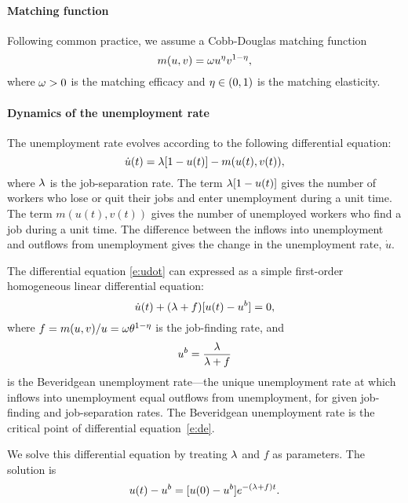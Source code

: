 \documentclass[letterpaper,12pt,leqno]{article}
\begin{document}
\paragraph{Matching function} Following common practice, we assume a Cobb-Douglas matching function
\begin{equation}
m(u,v)=\omega u^{\eta}v^{1-\eta},
\label{e:cobbdouglas}\end{equation}
where $\omega>0$ is the matching efficacy and $\eta\in(0,1)$ is the matching elasticity.

\paragraph{Dynamics of the unemployment rate} The unemployment rate evolves according to the following differential equation:
\begin{equation}
\dot{u}(t) = \lambda [1-u(t)] - m(u(t),v(t)),
\label{e:udot}\end{equation}
where $\lambda$ is the job-separation rate. The term $\lambda [1-u(t)]$ gives the number of workers who lose or quit their jobs and enter unemployment during a unit time. The term $m(u(t),v(t))$ gives the number of unemployed workers who find a job during a unit time. The difference between the inflows into unemployment and outflows from unemployment gives the change in the unemployment rate, $\dot{u}$.

The differential equation \eqref{e:udot} can expressed as a simple first-order homogeneous linear differential equation:
\begin{equation}
\dot{u}(t) + (\lambda+f) [u(t)- u^b] = 0,
\label{e:de}\end{equation}
where $f = m(u,v)/u = \omega \theta^{1-\eta}$ is the job-finding rate, and 
\begin{equation}
u^b = \frac{\lambda}{\lambda+f}
\label{e:ubar}\end{equation}
is the Beveridgean unemployment rate---the unique unemployment rate at which inflows into unemployment equal outflows from unemployment, for given job-finding and job-separation rates. The Beveridgean unemployment rate is the critical point of differential equation~\eqref{e:de}.

We solve this differential equation by treating $\lambda$ and $f$ as parameters. The solution is
\begin{equation}
u(t) - u^b = [u(0) - u^b] e^{-(\lambda+f)t}.
\label{e:ut}\end{equation}
\end{document}
